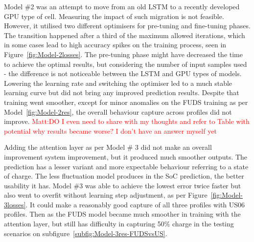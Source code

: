 %
%
Model \#2 was an attempt to move from an old LSTM to a recently developed GPU type of cell.
Measuring the impact of such migration is not feasible.
However, it utilised two different optimisers for pre-tuning and fine-tuning phases.
The transition happened after a third of the maximum allowed iterations, which in some cases lead to high accuracy spikes on the training process, seen in Figure~\ref{fig:Model-2losses}.
The pre-tuning phase might have decreased the time to achieve the optimal results, but considering the number of input samples used - the difference is not noticeable between the LSTM and GPU types of models.
Lowering the learning rate and switching the optimiser led to a much stable learning curve but did not bring any improved prediction results.
Despite that training went smoother, except for minor anomalies on the FUDS training as per Model~\ref{fig:Model-2res}, the overall behaviour capture across profiles did not improve.
\textcolor{red}{Matt:DO I even need to share with my thoughts and refer to Table with potential why results became worse? I don't have an answer myself yet}

%
%
Adding the attention layer as per Model \# 3 did not make an overall improvement system improvement, but it produced much smoother outputs.
The prediction has a lesser variant and more expectable behaviour referring to a state of charge.
The less fluctuation model produces in the SoC prediction, the better usability it has.
Model \#3 was able to achieve the lowest error twice faster but also went to overfit without learning step adjustment, as per Figure~\ref{fig:Model-3losses}.
It could make a reasonably good capture of all three profiles with US06 profiles.
Then as the FUDS model became much smoother in training with the attention layer, but still has difficulty in capturing 50\% charge in the testing scenarios on subfigure~\ref{subfig:Model-3res-FUDSvsUS}. 

